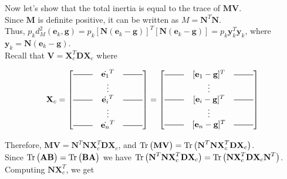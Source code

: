 \begin{notechapter}
Now let's show that the total inertia is equal to the trace of $\textbf{M}\textbf{V}$.\\

Since $\textbf{M}$ is definite positive, it can be written as $M=\textbf{N}^T \textbf{N}$.\\

Thus, $p_{k} d_{M}^2(\textbf{e}_k,\textbf{g}) = p_{k} [\textbf{N}(\textbf{e}_k-\textbf{g})]^T [\textbf{N} (\textbf{e}_k - \textbf{g})] = p_k \textbf{y}_k^T \textbf{y}_k$,
where $\textbf{y}_k = \textbf{N}(\textbf{e}_k - \textbf{g})$.\\

Recall that  $\textbf{V} = \textbf{X}_c^T \textbf{D} \textbf{X}_c$ where

\begin{align*}
    \textbf{X}_c =
    \begin{bmatrix*}
        \horzbar &\dot{\textbf{e}_{1}}^T& \horzbar\\
        &\vdots&\\
        \horzbar &\dot{\textbf{e}_{i}}^T& \horzbar\\
        &\vdots&\\
        \horzbar &\dot{\textbf{e}_{n}}^T& \horzbar
    \end{bmatrix*} 
    =
    \begin{bmatrix*}
        \horzbar &[\textbf{e}_{1} - \textbf{g}]^T& \horzbar\\
        &\vdots&\\
        \horzbar &[\textbf{e}_{i} - \textbf{g}]^T& \horzbar\\
        &\vdots&\\
        \horzbar &[\textbf{e}_{n} - \textbf{g}]^T& \horzbar
    \end{bmatrix*}
\end{align*}

Therefore, $\textbf{M} \textbf{V} = \textbf{N}^T \textbf{N} \textbf{X}_c^T \textbf{D} \textbf{X}_c$, and 
$\operatorname{Tr} \big(\textbf{M} \textbf{V} \big) = \operatorname{Tr} \big(\textbf{N}^T \textbf{N} \textbf{X}_c^T \textbf{D} \textbf{X}_c \big)$.\\

Since $\operatorname{Tr} \big(\textbf{A} \textbf{B} \big) = \operatorname{Tr} \big(\textbf{B} \textbf{A} \big)$ we have 
$\operatorname{Tr} \big(\textbf{N}^T \textbf{N} \textbf{X}_c^T \textbf{D} \textbf{X}_c \big) = 
\operatorname{Tr} \big(\textbf{N} \textbf{X}_c^T \textbf{D} \textbf{X}_c \textbf{N}^T \big)$.\\

Computing $\textbf{N}\textbf{X}_c^T$, we get


\end{notechapter}
